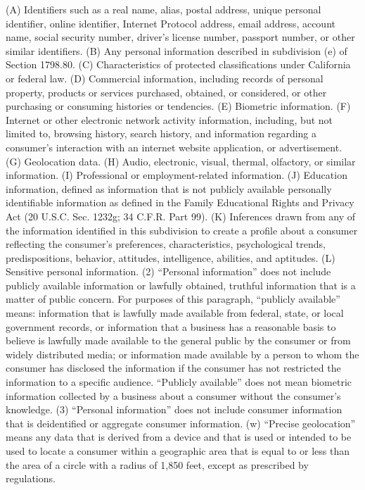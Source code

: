 (A) Identifiers such as a real name, alias, postal address, unique personal identifier, online identifier, Internet Protocol address, email address, account name, social security number, driver’s license number, passport number, or other similar identifiers.
(B) Any personal information described in subdivision (e) of Section 1798.80.
(C) Characteristics of protected classifications under California or federal law.
(D) Commercial information, including records of personal property, products or services purchased, obtained, or considered, or other purchasing or consuming histories or tendencies.
(E) Biometric information.
(F) Internet or other electronic network activity information, including, but not limited to, browsing history, search history, and information regarding a consumer’s interaction with an internet website application, or advertisement.
(G) Geolocation data.
(H) Audio, electronic, visual, thermal, olfactory, or similar information.
(I) Professional or employment-related information.
(J) Education information, defined as information that is not publicly available personally identifiable information as defined in the Family Educational Rights and Privacy Act (20 U.S.C. Sec. 1232g; 34 C.F.R. Part 99).
(K) Inferences drawn from any of the information identified in this subdivision to create a profile about a consumer reflecting the consumer’s preferences, characteristics, psychological trends, predispositions, behavior, attitudes, intelligence, abilities, and aptitudes.
(L) Sensitive personal information.
(2) “Personal information” does not include publicly available information or lawfully obtained, truthful information that is a matter of public concern. For purposes of this paragraph, “publicly available” means: information that is lawfully made available from federal, state, or local government records, or information that a business has a reasonable basis to believe is lawfully made available to the general public by the consumer or from widely distributed media; or information made available by a person to whom the consumer has disclosed the information if the consumer has not restricted the information to a specific audience. “Publicly available” does not mean biometric information collected by a business about a consumer without the consumer’s knowledge.
(3) “Personal information” does not include consumer information that is deidentified or aggregate consumer information.
(w) “Precise geolocation” means any data that is derived from a device and that is used or intended to be used to locate a consumer within a geographic area that is equal to or less than the area of a circle with a radius of 1,850 feet, except as prescribed by regulations.
